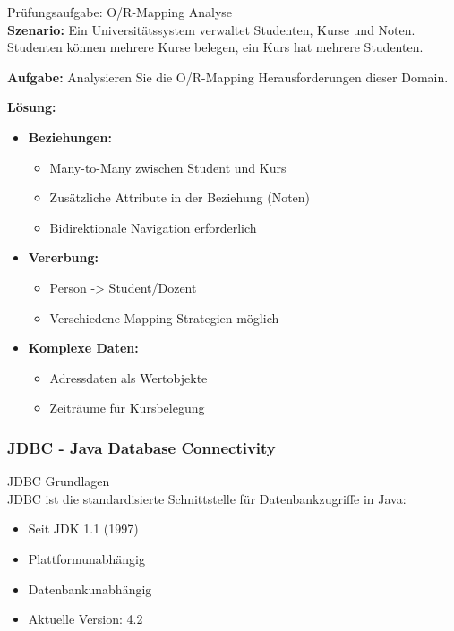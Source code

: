 \begin{example2}{Prüfungsaufgabe: O/R-Mapping Analyse}\\
\textbf{Szenario:}
Ein Universitätssystem verwaltet Studenten, Kurse und Noten. Studenten können mehrere 
Kurse belegen, ein Kurs hat mehrere Studenten.

\textbf{Aufgabe:} 
Analysieren Sie die O/R-Mapping Herausforderungen dieser Domain.

\textbf{Lösung:}
\begin{itemize}
    \item \textbf{Beziehungen:}
    \begin{itemize}
        \item Many-to-Many zwischen Student und Kurs
        \item Zusätzliche Attribute in der Beziehung (Noten)
        \item Bidirektionale Navigation erforderlich
    \end{itemize}
    
    \item \textbf{Vererbung:}
    \begin{itemize}
        \item Person -> Student/Dozent
        \item Verschiedene Mapping-Strategien möglich
    \end{itemize}
    
    \item \textbf{Komplexe Daten:}
    \begin{itemize}
        \item Adressdaten als Wertobjekte
        \item Zeiträume für Kursbelegung
    \end{itemize}
\end{itemize}
\end{example2}

\columnbreak

\subsubsection{JDBC - Java Database Connectivity}

\begin{definition}{JDBC Grundlagen}\\
JDBC ist die standardisierte Schnittstelle für Datenbankzugriffe in Java:
\begin{itemize}
    \item Seit JDK 1.1 (1997)
    \item Plattformunabhängig
    \item Datenbankunabhängig
    \item Aktuelle Version: 4.2
\end{itemize}
\end{definition}

